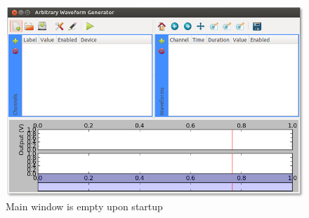 
\begin{figure}[hb]
  \centerline{\includegraphics[width=\textwidth]{figures/main-empty}}
  \caption{Main window is empty upon startup}
  \label{fig:quick:main-empty}
\end{figure}



